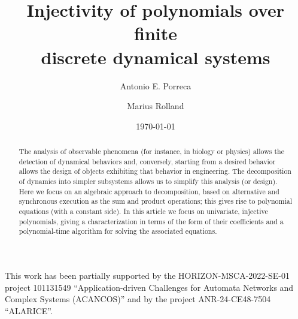 \documentclass[runningheads,a4paper]{llncs}
\title{Injectivity of polynomials over finite\\discrete dynamical systems}
\author{
	Antonio E. Porreca
	\and
	Marius Rolland
}
\institute{
  Aix-Marseille Université, CNRS, LIS, Marseille, France\\
  \email{marius.rolland@lis-lab.fr}
}
\date{\today}
\begin{document}
	\maketitle
	\begin{abstract}
        The analysis of observable phenomena (for instance, in biology or physics) allows the detection of dynamical behaviors and, conversely, starting from a desired behavior allows the design of objects exhibiting that behavior in engineering. The decomposition of dynamics into simpler subsystems allows us to simplify this analysis (or design). Here we focus on an algebraic approach to decomposition, based on alternative and synchronous execution as the sum and product operations; this gives rise to polynomial equations (with a constant side). In this article we focus on univariate, injective polynomials, giving a characterization in terms of the form of their coefficients and a polynomial-time algorithm for solving the associated equations.
	\end{abstract}
	
	

	
	
	
	
	
	
	

	
	
	\begin{credits}
        \subsubsection{\ackname}
        This work has been partially supported by the HORIZON-MSCA-2022-SE-01 project 101131549 ``Application-driven Challenges for Automata Networks and Complex Systems (ACANCOS)'' and by the project ANR-24-CE48-7504 ``ALARICE''.
	\end{credits}

	
	
	
\end{document}
